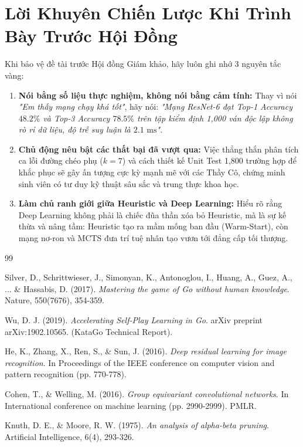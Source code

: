 \documentclass[11pt,a4paper]{report}
\begin{document}
\section{Lời Khuyên Chiến Lược Khi Trình Bày Trước Hội Đồng}

Khi bảo vệ đề tài trước Hội đồng Giám khảo, hãy luôn ghi nhớ 3 nguyên tắc vàng:
\begin{enumerate}
    \item \textbf{Nói bằng số liệu thực nghiệm, không nói bằng cảm tính:} Thay vì nói \textit{"Em thấy mạng chạy khá tốt"}, hãy nói: \textit{"Mạng ResNet-6 đạt Top-1 Accuracy $48.2\%$ và Top-3 Accuracy $78.5\%$ trên tập kiểm định 1,000 ván độc lập không rò rỉ dữ liệu, độ trễ suy luận là $2.1\text{ ms}$"}.
    \item \textbf{Chủ động nêu bật các thất bại đã vượt qua:} Việc thẳng thắn phân tích ca lỗi đường chéo phụ ($k=7$) và cách thiết kế Unit Test 1,800 trường hợp để khắc phục sẽ gây ấn tượng cực kỳ mạnh mẽ với các Thầy Cô, chứng minh sinh viên có tư duy kỹ thuật sâu sắc và trung thực khoa học.
    \item \textbf{Làm chủ ranh giới giữa Heuristic và Deep Learning:} Hiểu rõ rằng Deep Learning không phải là chiếc đũa thần xóa bỏ Heuristic, mà là sự kế thừa và nâng tầm: Heuristic tạo ra mầm mống ban đầu (Warm-Start), còn mạng nơ-ron và MCTS đưa trí tuệ nhân tạo vươn tới đẳng cấp tối thượng.

\end{enumerate}

\begin{thebibliography}{99}

Silver, D., Schrittwieser, J., Simonyan, K., Antonoglou, I., Huang, A., Guez, A., ... \& Hassabis, D. (2017). 
\textit{Mastering the game of Go without human knowledge}. 
Nature, 550(7676), 354-359.

Wu, D. J. (2019). 
\textit{Accelerating Self-Play Learning in Go}. 
arXiv preprint arXiv:1902.10565. (KataGo Technical Report).

He, K., Zhang, X., Ren, S., \& Sun, J. (2016). 
\textit{Deep residual learning for image recognition}. 
In Proceedings of the IEEE conference on computer vision and pattern recognition (pp. 770-778).

Cohen, T., \& Welling, M. (2016). 
\textit{Group equivariant convolutional networks}. 
In International conference on machine learning (pp. 2990-2999). PMLR.

Knuth, D. E., \& Moore, R. W. (1975). 
\textit{An analysis of alpha-beta pruning}. 
Artificial Intelligence, 6(4), 293-326.

\end{thebibliography}
\end{document}
